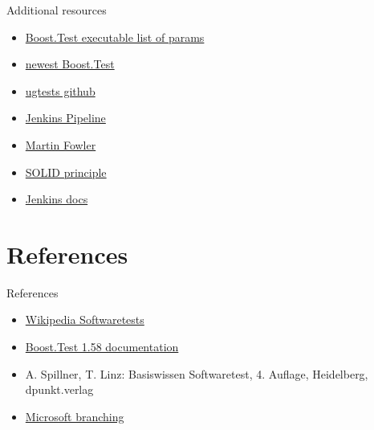 \documentclass{beamer}
\begin{document}
    \begin{frame}{Additional resources}
            \begin{itemize}
                \item \href{https://www.boost.org/doc/libs/1_58_0/libs/test/doc/html/utf/user-guide/runtime-config/reference.html}{Boost.Test executable list of params}
                \item \href{https://www.boost.org/doc/libs/1_73_0/libs/test/}{newest Boost.Test} %
                \item \href{https://github.com/UG4/plugin_UGTest}{ugtests github}
                \item \href{https://www.jenkins.io/doc/book/pipeline/syntax/}{Jenkins Pipeline}
                \item \href{https://martinfowler.com/articles/practical-test-pyramid.html}{Martin Fowler}
                \item \href{https://en.wikipedia.org/wiki/SOLID}{SOLID principle}
                \item \href{https://www.jenkins.io/doc/}{Jenkins docs}
            \end{itemize}
    \end{frame}

    \section{References}
    \begin{frame}{References}
        \begin{itemize}
            \item \href{https://en.wikipedia.org/wiki/Software_testing}{Wikipedia Softwaretests}
            \item \href{https://www.boost.org/doc/libs/1_58_0/libs/test/}{Boost.Test 1.58 documentation}
            \item A. Spillner, T. Linz: Basiswissen Softwaretest, 4. Auflage, Heidelberg, dpunkt.verlag%
            \item \href{https://docs.microsoft.com/en-us/azure/devops/repos/git/git-branching-guidance?view=azure-devops}{Microsoft branching}
        \end{itemize}
    \end{frame}
\end{document}
